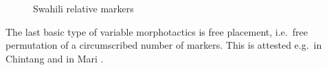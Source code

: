 \documentclass[output=paper
 	        ,biblatex
                ,babelshorthands
                ,newtxmath
                ,draftmode
                ,colorlinks, citecolor=brown
]{langscibook}
\begin{document}
\begin{exe}
\begin{xlist}
\begin{exe}
\begin{xlist}
\begin{figure}
  \centering
  
\caption{Swahili relative markers}\label{fig:SwahiliRel}
\end{figure}


The last basic type of variable morphotactics is free placement,
i.e.\ free permutation of a circumscribed number of
markers. This is attested e.g.\ in Chintang \citep{Bickel07} and in
Mari \citep{Luutonen97}.



\end{xlist}
\end{exe}
\end{xlist}
\end{exe}
\end{document}
